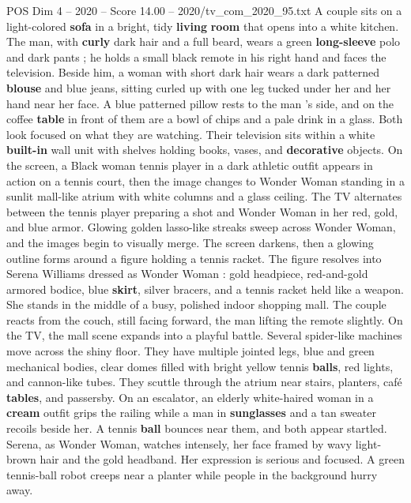 \begin{textsample}{POS Dim 4 – 2020 – Score 14.00 – 2020/tv\_com\_2020\_95.txt}  \label{ex:f4_pos_020}
A couple sits on a light-colored \textbf{sofa} in a bright, tidy \textbf{living} \textbf{room} that opens into a white kitchen.
The man, with \textbf{curly} dark hair and a full beard, wears a green \textbf{long-sleeve} polo and dark pants ; he holds a small black remote in his right hand and faces the television.
Beside him, a woman with short dark hair wears a dark patterned \textbf{blouse} and blue jeans, sitting curled up with one leg tucked under her and her hand near her face.
A blue patterned pillow rests to the man ’s side, and on the coffee \textbf{table} in front of them are a bowl of chips and a pale drink in a glass.
Both look focused on what they are watching.
Their television sits within a white \textbf{built-in} wall unit with shelves holding books, vases, and \textbf{decorative} objects.
On the screen, a Black woman tennis player in a dark athletic outfit appears in action on a tennis court, then the image changes to Wonder Woman standing in a sunlit mall-like atrium with white columns and a glass ceiling.
The TV alternates between the tennis player preparing a shot and Wonder Woman in her red, gold, and blue armor.
Glowing golden lasso-like streaks sweep across Wonder Woman, and the images begin to visually merge.
The screen darkens, then a glowing outline forms around a figure holding a tennis racket.
The figure resolves into Serena Williams dressed as Wonder Woman : gold headpiece, red-and-gold armored bodice, blue \textbf{skirt}, silver bracers, and a tennis racket held like a weapon.
She stands in the middle of a busy, polished indoor shopping mall.
The couple reacts from the couch, still facing forward, the man lifting the remote slightly.
On the TV, the mall scene expands into a playful battle.
Several spider-like machines move across the shiny floor.
They have multiple jointed legs, blue and green mechanical bodies, clear domes filled with bright yellow tennis \textbf{balls}, red lights, and cannon-like tubes.
They scuttle through the atrium near stairs, planters, café \textbf{tables}, and passersby.
On an escalator, an elderly white-haired woman in a \textbf{cream} outfit grips the railing while a man in \textbf{sunglasses} and a tan sweater recoils beside her.
A tennis \textbf{ball} bounces near them, and both appear startled.
Serena, as Wonder Woman, watches intensely, her face framed by wavy light-brown hair and the gold headband.
Her expression is serious and focused.
A green tennis-ball robot creeps near a planter while people in the background hurry away.

\end{textsample}
